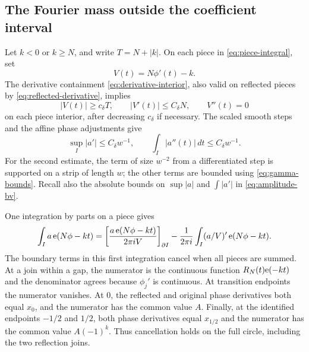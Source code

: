\subsection{The Fourier mass outside the coefficient interval}

Let $k<0$ or $k\ge N$, and write $T=N+|k|$.
On each piece in \eqref{eq:piece-integral}, set
\[
 V(t)=N\phi'(t)-k.
\]
The derivative containment \eqref{eq:derivative-interior}, also valid on
reflected pieces by \eqref{eq:reflected-derivative}, implies
\begin{equation}\label{eq:exterior-derivatives}
 |V(t)|\ge c_\delta T,
 \qquad |V'(t)|\le C_\delta N,
 \qquad V''(t)=0
\end{equation}
on each piece interior, after decreasing $c_\delta$ if necessary.
The scaled smooth steps and the affine phase adjustments give
\begin{equation}\label{eq:amplitude-two-derivatives}
 \sup_I|a'|\le C_\delta w^{-1},
 \qquad \int_I|a''(t)|\,dt\le C_\delta w^{-1}.
\end{equation}
For the second estimate, the term of size $w^{-2}$ from a differentiated
step is supported on a strip of length $w$; the other terms are bounded
using \eqref{eq:gamma-bounds}.  Recall also the absolute bounds on
$\sup|a|$ and $\int|a'|$ in \eqref{eq:amplitude-bv}.

One integration by parts on a piece gives
\begin{equation}\label{eq:first-ibp-tail}
 \int_I a\,\mathrm e(N\phi-kt)
 =\left[\frac{a\,\mathrm e(N\phi-kt)}{2\pi iV}\right]_{\partial I}
 -\frac1{2\pi i}\int_I(a/V)'\,\mathrm e(N\phi-kt).
\end{equation}
The boundary terms in this first integration cancel when all pieces
are summed.  At a join within a gap, the numerator is the continuous
function $R_N(t)\mathrm e(-kt)$ and the denominator agrees because $\phi_j'$
is continuous.  At transition endpoints the numerator vanishes.
At $0$, the reflected and original phase derivatives both equal $x_0$,
and the numerator has the common value $A$.  Finally, at the identified
endpoints $-1/2$ and $1/2$, both phase derivatives equal $x_{1/2}$ and
the numerator has the common value $A(-1)^k$.  Thus cancellation holds
on the full circle, including the two reflection joins.

